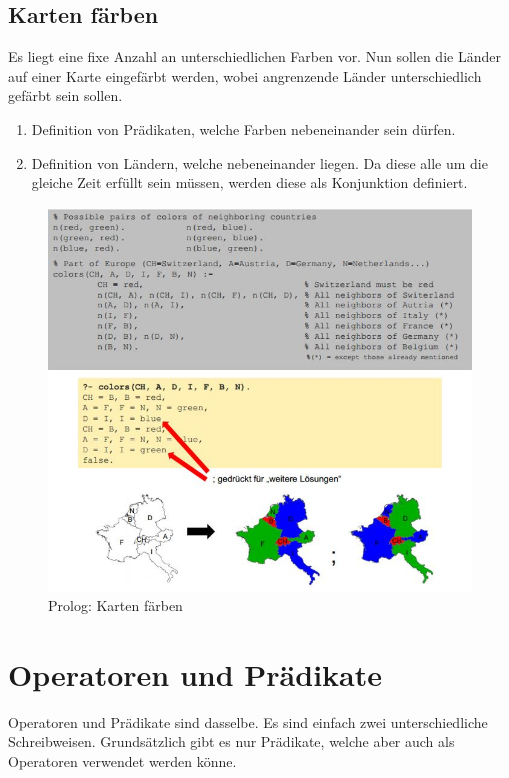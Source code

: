 \subsection{Karten färben}
Es liegt eine fixe Anzahl an unterschiedlichen Farben vor. Nun sollen die Länder auf einer Karte eingefärbt werden, wobei angrenzende Länder unterschiedlich gefärbt sein sollen. 
\begin{enumerate}
	\item Definition von Prädikaten, welche Farben nebeneinander sein dürfen.
	\item Definition von Ländern, welche nebeneinander liegen. Da diese alle um die gleiche Zeit erfüllt sein müssen, werden diese als Konjunktion definiert.
\end{enumerate}

\begin{figure}[h!]
\centering
\includegraphics[width=1\linewidth]{fig/prolog-karten-faerben}
\caption{Prolog: Karten färben}
\label{fig:prolog-karten-faerben}
\end{figure}

\newpage
\section{Operatoren und Prädikate}
Operatoren und Prädikate sind dasselbe. Es sind einfach zwei unterschiedliche Schreibweisen. Grundsätzlich gibt es nur Prädikate, welche aber auch als Operatoren verwendet werden könne.

